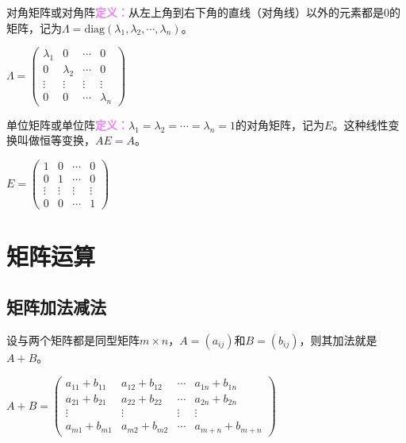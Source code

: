 \documentclass[UTF8, 12pt]{ctexart}
\begin{document}
\begin{multicols}{2}
    
    
    对角矩阵或对角阵\textcolor{violet}{\textbf{定义：}}从左上角到右下角的直线（对角线）以外的元素都是0的矩阵，记为$\varLambda=\textrm{diag}(\lambda_1,\lambda_2,\cdots,\lambda_n)$。

    $\varLambda=\left(
        \begin{array}{cccc}
            \lambda_1 & 0 & \cdots & 0 \\
            0 & \lambda_2 & \cdots & 0 \\
            \vdots & \vdots & \vdots & \vdots \\
            0 & 0 & \cdots & \lambda_n
        \end{array}
    \right)$

    单位矩阵或单位阵\textcolor{violet}{\textbf{定义：}}$\lambda_1=\lambda_2=\cdots=\lambda_n=1$的对角矩阵，记为$E$。这种线性变换叫做恒等变换，$AE=A$。 \medskip

    $E=\left(
        \begin{array}{cccc}
            1 & 0 & \cdots & 0 \\
            0 & 1 & \cdots & 0 \\
            \vdots & \vdots & \vdots & \vdots \\
            0 & 0 & \cdots & 1
        \end{array}
    \right)$

\end{multicols}

\section{矩阵运算}

\subsection{矩阵加法减法}

设与两个矩阵都是同型矩阵$m\times n$，$A=(a_{ij})$和$B=(b_{ij})$，则其加法就是$A+B$。

$A+B=\left(
    \begin{array}{cccc}
        a_{11}+b_{11} & a_{12}+b_{12} & \cdots & a_{1n}+b_{1n} \\
        a_{21}+b_{21} & a_{22}+b_{22} & \cdots & a_{2n}+b_{2n} \\
        \vdots & \vdots & \vdots & \vdots \\
        a_{m1}+b_{m1} & a_{m2}+b_{m2} & \cdots & a_{m+n}+b_{m+n}
    \end{array}
\right)$
\end{document}
